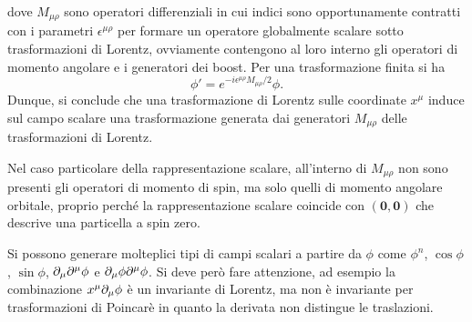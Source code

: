 dove $M_{\mu\rho}$ sono operatori differenziali in cui indici sono opportunamente contratti con i parametri $\epsilon^{\mu\rho}$ per formare un operatore globalmente scalare sotto trasformazioni di Lorentz, ovviamente contengono al loro interno gli operatori di momento angolare e i generatori dei boost. Per una trasformazione finita si ha
\begin{equation}
    \phi' = e^{-i\epsilon^{\mu\rho}M_{\mu\rho}/2}\phi.
\end{equation}
Dunque, si conclude che una trasformazione di Lorentz sulle coordinate $x^\mu$ induce sul campo scalare una trasformazione generata dai generatori $M_{\mu\rho}$ delle trasformazioni di Lorentz.
\begin{obs}
    Nel caso particolare della rappresentazione scalare, all'interno di $M_{\mu\rho}$ non sono presenti gli operatori di momento di spin, ma solo quelli di momento angolare orbitale, proprio perché la rappresentazione scalare coincide con $\bm{(0,0)}$ che descrive una particella a spin zero.
\end{obs}
\begin{obs}
    Si possono generare molteplici tipi di campi scalari a partire da $\phi$ come $\phi^n$, $\cos{\phi}$, $\sin{\phi}$, $\partial_\mu\partial^\mu\phi$ e $\partial_\mu\phi\partial^\mu\phi$. Si deve però fare attenzione, ad esempio la combinazione $x^\mu\partial_\mu\phi$ è un invariante di Lorentz, ma non è invariante per trasformazioni di Poincarè in quanto la derivata non distingue le traslazioni. 
\end{obs}

